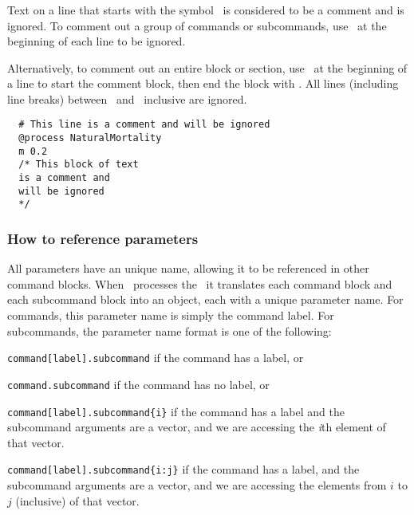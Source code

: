 \subsubsection{}

Text on a line that starts with the symbol \commentline\ is considered to be a comment and is ignored. To comment out a group of commands or subcommands, use \commentline\ at the beginning of each line to be ignored.

Alternatively, to comment out an entire block or section, use \commentstart\ at the beginning of a line to start the comment block, then end the block with \commentend. All lines (including line breaks) between \commentstart\ and \commentend\ inclusive are ignored.

\small{\begin{verbatim}
  # This line is a comment and will be ignored
  @process NaturalMortality
  m 0.2
  /* This block of text
  is a comment and
  will be ignored
  */
\end{verbatim}}

\subsubsection{How to reference parameters\label{sec:parameter-names}}

All parameters have an unique name, allowing it to be referenced in other command blocks. When \CNAME\ processes the \config\ it translates each command block and each subcommand block into an object, each with a unique parameter name. For commands, this parameter name is simply the command label. For subcommands, the parameter name format is one of the following:

\begin{description}
\item \texttt{command[label].subcommand} if the command has a label, or
\item \texttt{command.subcommand} if the command has no label, or
\item \texttt{command[label].subcommand\{i\}} if the command has a label and the subcommand arguments are a vector, and we are accessing the  \emph{i}th element of that vector.
\item \texttt{command[label].subcommand\{i:j\}} if the command has a label, and the subcommand arguments are a vector, and we are accessing the elements from $i$ to $j$ (inclusive) of that vector.
\end{description}

